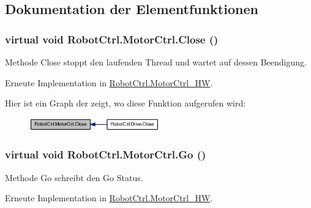 \subsection{Dokumentation der Elementfunktionen}
\hypertarget{class_robot_ctrl_1_1_motor_ctrl_aa4d43c3586f611f8ca12924b0a92189b}{
\subsubsection[{Close}]{\setlength{\rightskip}{0pt plus 5cm}virtual void RobotCtrl.MotorCtrl.Close ()}}
\label{class_robot_ctrl_1_1_motor_ctrl_aa4d43c3586f611f8ca12924b0a92189b}
Methode Close stoppt den laufenden Thread und wartet auf dessen Beendigung. 

Erneute Implementation in \hyperlink{class_robot_ctrl_1_1_motor_ctrl___h_w_a134912d08a58d3762ce7694294599d7c}{RobotCtrl.MotorCtrl\_\-HW}.



Hier ist ein Graph der zeigt, wo diese Funktion aufgerufen wird:\nopagebreak
\begin{figure}[H]
\begin{center}
\leavevmode
\includegraphics[width=159pt]{class_robot_ctrl_1_1_motor_ctrl_aa4d43c3586f611f8ca12924b0a92189b_icgraph}
\end{center}
\end{figure}


\hypertarget{class_robot_ctrl_1_1_motor_ctrl_a1c2505454168fc2d4287fe7052425d4e}{
\subsubsection[{Go}]{\setlength{\rightskip}{0pt plus 5cm}virtual void RobotCtrl.MotorCtrl.Go ()}}
\label{class_robot_ctrl_1_1_motor_ctrl_a1c2505454168fc2d4287fe7052425d4e}
Methode Go schreibt den Go Status. 

Erneute Implementation in \hyperlink{class_robot_ctrl_1_1_motor_ctrl___h_w_a451b6be6938c652e8a284545a1929089}{RobotCtrl.MotorCtrl\_\-HW}.


